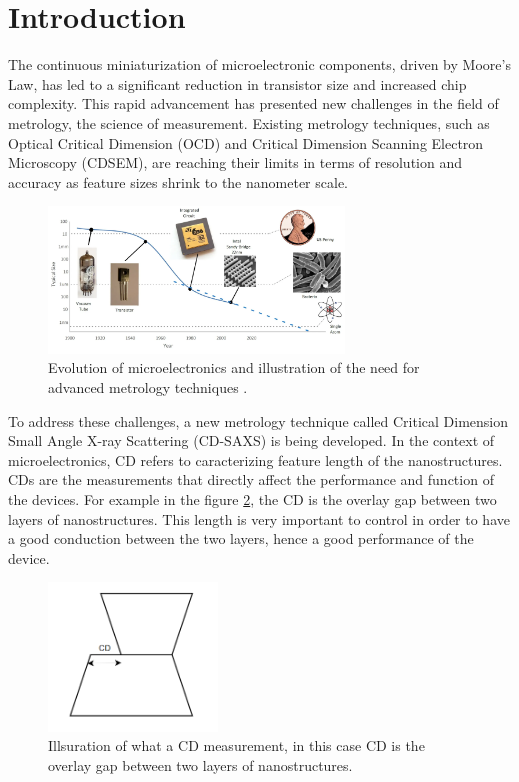 \section{Introduction}

\medskip

The continuous miniaturization of microelectronic components, driven by Moore's Law, 
has led to a significant reduction in transistor size and increased chip complexity.
This rapid advancement has presented new challenges in the field of metrology, the science of measurement.
Existing metrology techniques, such as Optical Critical Dimension (OCD) and Critical Dimension Scanning 
Electron Microscopy (CDSEM), are reaching their limits in terms of resolution and accuracy as feature sizes
shrink to the nanometer scale.


\begin{figure}[h]
    \centering
    \includegraphics[width=0.7\textwidth]{images/moore's_law.png}
    \caption{Evolution of microelectronics and illustration of the need for advanced metrology techniques \cite{moore_law}.}
    \label{fig:evolution_microelectronics}
\end{figure}

\FloatBarrier

To address these challenges, a new metrology technique called Critical Dimension Small Angle X-ray Scattering
(CD-SAXS) is being developed. In the context of microelectronics, CD refers to caracterizing feature length
of the nanostructures. CDs are the measurements that directly affect the performance and function of the devices.
For example in the figure \ref{fig:cd_example}, the CD is the overlay gap between two layers of nanostructures.
This length is very important to control in order to have a good conduction between the two layers, hence
a good performance of the device.

\begin{figure}[h]
    \centering
    \includegraphics[width=0.4\textwidth]{images/CD_example.png}
    \caption{Illsuration of what a CD measurement, in this case CD is the overlay gap between two layers of nanostructures.}
    \label{fig:cd_example}
\end{figure}



